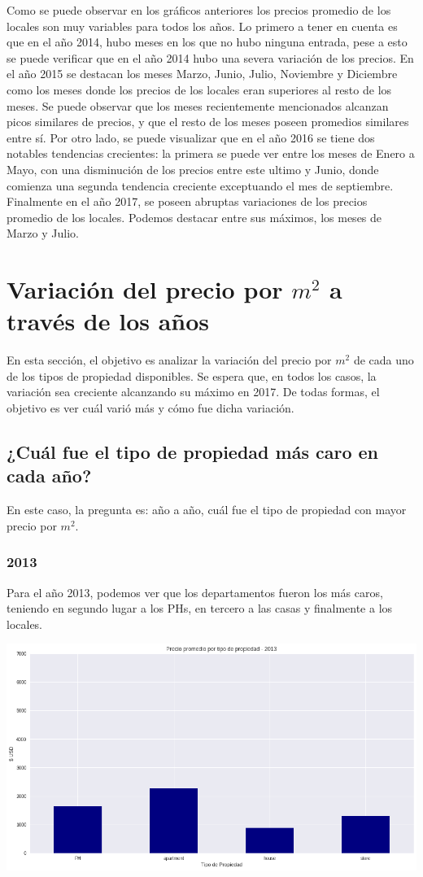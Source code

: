 \documentclass[a4paper, 10pt]{article}
\begin{document}
			Como se puede observar en los gráficos anteriores los precios promedio de los locales son muy variables para todos los años. Lo primero a tener en cuenta es que en el año 2014, hubo meses en los que no hubo ninguna entrada, pese a esto se puede verificar que en el año 2014 hubo una severa variación de los precios. En el año 2015 se destacan los meses Marzo, Junio, Julio, Noviembre y Diciembre como los meses donde los precios de los locales eran superiores al resto de los meses. Se puede observar que los meses recientemente mencionados alcanzan picos similares de precios, y que el resto de los meses poseen promedios similares entre sí. Por otro lado, se puede visualizar que en el año 2016 se tiene dos notables tendencias crecientes: la primera se puede ver entre los meses de Enero a Mayo, con una disminución de los precios entre este ultimo y Junio, donde comienza una segunda tendencia creciente exceptuando el mes de septiembre. Finalmente en el año 2017, se poseen abruptas variaciones de los precios promedio de los locales. Podemos destacar entre sus máximos, los meses de Marzo y Julio.

		\section{Variación del precio por $m^2$ a través de los años}
			En esta sección, el objetivo es analizar la variación del precio por $m^2$ de cada uno de los tipos de propiedad
			disponibles. Se espera que, en todos los casos, la variación sea creciente alcanzando su máximo en 2017. De todas formas,
			el objetivo es ver cuál varió más y cómo fue dicha variación.
			\subsection{¿Cuál fue el tipo de propiedad más caro en cada año?}
				En este caso, la pregunta es: año a año, cuál fue el tipo de propiedad con mayor precio por $m^2$.
				\subsubsection{2013}
					Para el año 2013, podemos ver que los departamentos fueron los más caros, teniendo en segundo lugar a los
					PHs, en tercero a las casas y finalmente a los locales.
					\begin{center}
   		    				\includegraphics[width=\textwidth]{images/propPrice2013}
				  	\end{center}
\end{document}
